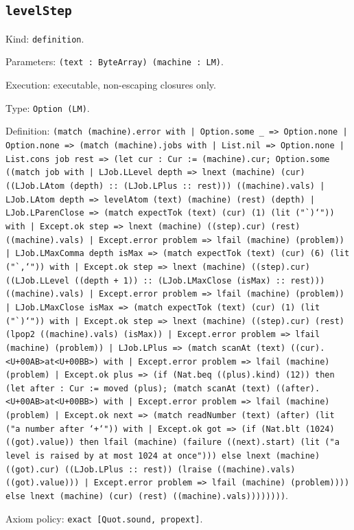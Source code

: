 \documentclass[11pt]{article}
\begin{document}
\subsection*{\texttt{levelStep}}
\noindent Kind: \texttt{definition}.\par
\noindent Parameters: \texttt{(text : ByteArray) (machine : LM)}.\par
\noindent Execution: executable, non-escaping closures only.\par
\noindent Type: \texttt{Option (LM)}.\par
\noindent Definition: \texttt{(match (machine).error with | Option.some \_ => Option.none | Option.none => (match (machine).jobs with | List.nil => Option.none | List.cons job rest => (let cur : Cur := (machine).cur; Option.some ((match job with | LJob.LLevel depth => lnext (machine) (cur) ((LJob.LAtom (depth) :: (LJob.LPlus :: rest))) ((machine).vals) | LJob.LAtom depth => levelAtom (text) (machine) (rest) (depth) | LJob.LParenClose => (match expectTok (text) (cur) (1) (lit ("`)`")) with | Except.ok step => lnext (machine) ((step).cur) (rest) ((machine).vals) | Except.error problem => lfail (machine) (problem)) | LJob.LMaxComma depth isMax => (match expectTok (text) (cur) (6) (lit ("`,`")) with | Except.ok step => lnext (machine) ((step).cur) ((LJob.LLevel ((depth + 1)) :: (LJob.LMaxClose (isMax) :: rest))) ((machine).vals) | Except.error problem => lfail (machine) (problem)) | LJob.LMaxClose isMax => (match expectTok (text) (cur) (1) (lit ("`)`")) with | Except.ok step => lnext (machine) ((step).cur) (rest) (lpop2 ((machine).vals) (isMax)) | Except.error problem => lfail (machine) (problem)) | LJob.LPlus => (match scanAt (text) ((cur).<U+00AB>at<U+00BB>) with | Except.error problem => lfail (machine) (problem) | Except.ok plus => (if (Nat.beq ((plus).kind) (12)) then (let after : Cur := moved (plus); (match scanAt (text) ((after).<U+00AB>at<U+00BB>) with | Except.error problem => lfail (machine) (problem) | Except.ok next => (match readNumber (text) (after) (lit ("a number after `+`")) with | Except.ok got => (if (Nat.blt (1024) ((got).value)) then lfail (machine) (failure ((next).start) (lit ("a level is raised by at most 1024 at once"))) else lnext (machine) ((got).cur) ((LJob.LPlus :: rest)) (lraise ((machine).vals) ((got).value))) | Except.error problem => lfail (machine) (problem)))) else lnext (machine) (cur) (rest) ((machine).vals))))))))}.\par
\noindent Axiom policy: \texttt{exact [Quot.sound, propext]}.\par
\end{document}
